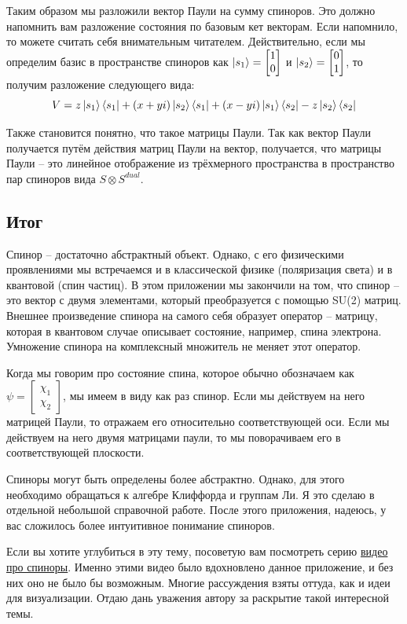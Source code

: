 Таким образом мы разложили вектор Паули на сумму спиноров. Это должно напомнить вам разложение состояния по базовым кет векторам. Если напомнило, то можете считать себя внимательным читателем. Действительно, если мы определим базис в пространстве спиноров как $\ket{s_1} = \begin{bmatrix} 1 \\ 0 \end{bmatrix}$ и $\ket{s_2} = \begin{bmatrix} 0 \\ 1 \end{bmatrix}$, то получим разложение следующего вида:
\[
V = z \ket{s_1}\bra{s_1} + (x + yi)\ket{s_2}\bra{s_1} + (x-yi)\ket{s_1}\bra{s_2} - z \ket{s_2}\bra{s_2}
\]

Также становится понятно, что такое матрицы Паули. Так как вектор Паули получается путём действия матриц Паули на вектор, получается, что матрицы Паули -- это линейное отображение из трёхмерного пространства в пространство пар спиноров вида $S \otimes S^{dual}$.
\subsection{Итог}

Спинор -- достаточно абстрактный объект. Однако, с его физическими проявлениями мы встречаемся и в классической физике (поляризация света) и в квантовой (спин частиц). В этом приложении мы закончили на том, что спинор -- это вектор с двумя элементами, который преобразуется с помощью SU(2) матриц. Внешнее произведение спинора на самого себя образует оператор -- матрицу, которая в квантовом случае описывает состояние, например, спина электрона. Умножение спинора на комплексный множитель не меняет этот оператор.

Когда мы говорим про состояние спина, которое обычно обозначаем как $\psi = \begin{bmatrix} \chi_1 \\ \chi_2 \end{bmatrix}$, мы имеем в виду как раз спинор. Если мы действуем на него матрицей Паули, то отражаем его относительно соответствующей оси. Если мы действуем на него двумя матрицами паули, то мы поворачиваем его в соответствующей плоскости.

Спиноры могут быть определены более абстрактно. Однако, для этого необходимо обращаться к алгебре Клиффорда и группам Ли. Я это сделаю в отдельной небольшой справочной работе. После этого приложения, надеюсь, у вас сложилось более интуитивное понимание спиноров.

Если вы хотите углубиться в эту тему, посоветую вам посмотреть серию \href{https://www.youtube.com/watch?v=j5soqexrwqY&list=PLJHszsWbB6hoOo_wMb0b6T44KM_ABZtBs&ab_channel=eigenchris}{видео про спиноры}. Именно этими видео было вдохновлено данное приложение, и без них оно не было бы возможным. Многие рассуждения взяты оттуда, как и идеи для визуализации. Отдаю дань уважения автору за раскрытие такой интересной темы.
